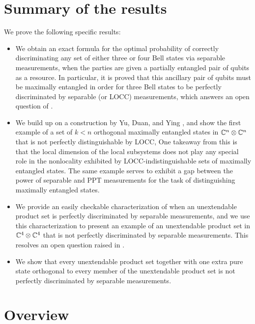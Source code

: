 \section{Summary of the results}
We prove the following specific results:
\begin{itemize}
\item We obtain an exact formula for the optimal probability of correctly 
discriminating any set of either three or four Bell states via separable 
measurements, when the parties are given a partially entangled pair of qubits as a resource. 
In particular, it is proved that this ancillary pair of qubits must be maximally 
entangled in order for three Bell states to be perfectly discriminated
by separable (or LOCC) measurements, which answers an open question of \cite{Yu14}.
\item We build up on a construction by Yu, Duan, and Ying \cite{Yu12}, and show
the first example of a set of $k < n$ orthogonal maximally entangled states 
in $\mathbb{C}^{n}\otimes\mathbb{C}^{n}$ that is not perfectly distinguishable by LOCC,
One takeaway from this is that the local dimension of the local subsystems does not 
play any special role in the nonlocality exhibited by LOCC-indistinguishable sets of 
maximally entangled states. 
The same example serves to exhibit a gap between the power of separable and PPT measurements
for the task of distinguishing maximally entangled states.
\item We provide an easily checkable characterization of when an unextendable 
product set is perfectly discriminated by separable measurements, and we use
this characterization to present an example of an unextendable product set in
$\mathbb{C}^{4}\otimes\mathbb{C}^{4}$ that is not perfectly discriminated by 
separable measurements. This resolves an open question raised in
\cite{Duan09}. 
\item We show that every unextendable product set together 
with one extra pure state orthogonal to every member of the unextendable product 
set is not perfectly discriminated by separable measurements.
\end{itemize}

\section{Overview}

